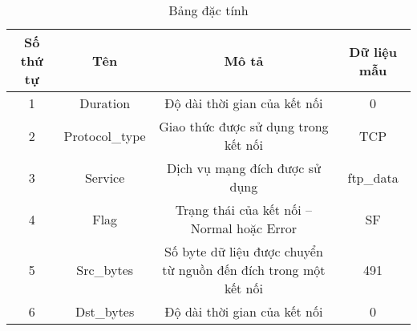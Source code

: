\begin{table}[!h]
	\begin{center}
        \begin{tabular} {| c | c | c | c |}
            \hline
            \textbf{Số thứ tự} & \textbf{Tên} & \textbf{Mô tả} & \textbf{Dữ liệu mẫu} \\
            \hline
            1 & Duration & Độ dài thời gian của kết nối & 0 \\
            2 & Protocol\_type & Giao thức được sử dụng trong kết nối & TCP \\
            3 & Service & Dịch vụ mạng đích được sử dụng & ftp\_data \\
            4 & Flag & Trạng thái của kết nối – Normal hoặc Error & SF \\
            5 & Src\_bytes & Số byte dữ liệu được chuyển từ nguồn đến đích trong một kết nối & 491 \\
            6 & Dst\_bytes & Độ dài thời gian của kết nối & 0 \\
            \hline
		\end{tabular}
	\end{center}
	\caption{Bảng đặc tính}
	\label{table:1}
\end{table}

